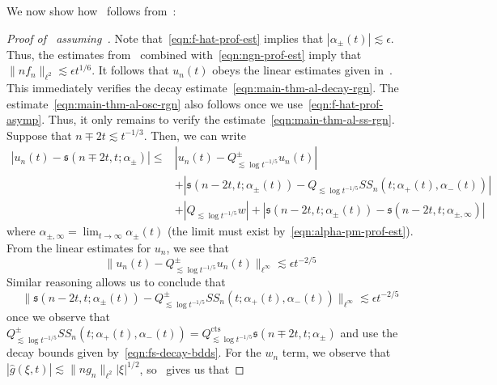 \documentclass[letterpaper, reqno,final]{amsart}
\newcommand{\fs}{\mathfrak{s}}
\newcommand{\mSS}{\mathit{SS}}
\newcommand{\tcts}{\text{cts}}
\begin{document}
We now show how~ follows from~:
\begin{proof}[Proof of~ assuming~]
    Note that~\eqref{eqn:f-hat-prof-est} implies that $|\alpha_\pm(t)| \lesssim \epsilon$.  Thus, the estimates from~ combined with~\eqref{eqn:ngn-prof-est} imply that $\lVert n f_n \rVert_{\ell^2} \lesssim \epsilon t^{1/6}$.  It follows that $u_n(t)$ obeys the linear estimates given in~.  This immediately verifies the decay estimate~\eqref{eqn:main-thm-al-decay-rgn}.  The estimate~\eqref{eqn:main-thm-al-osc-rgn} also follows once we use~\eqref{eqn:f-hat-prof-asymp}.  Thus, it only remains to verify the estimate~\eqref{eqn:main-thm-al-ss-rgn}.  Suppose that $n \mp 2t \lesssim t^{-1/3}$.  Then, we can write
    \begin{equation*}\begin{split}
        |u_n(t) - \fs(n \mp 2t, t; \alpha_{\pm})| \leq& |u_n(t) - Q_{\lesssim \log t^{-1/5}}^\pm u_n(t)|\\ 
        &+ |\fs(n - 2t, t; \alpha_\pm(t)) - Q_{\lesssim \log t^{-1/5}} \mSS_n(t;\alpha_{+}(t),\alpha_{-}(t))|\\ 
        &+ |Q_{\lesssim \log t^{-1/5}} w| + |\fs(n - 2t, t; \alpha_{\pm}(t)) - \fs(n - 2t, t; \alpha_{\pm,\infty})|
    \end{split}\end{equation*}
    where $\alpha_{\pm,\infty} = \lim_{t \to \infty} \alpha_\pm(t)$ (the limit must exist by~\eqref{eqn:alpha-pm-prof-est}).   From the linear estimates for $u_n$, we see that
    \begin{equation*}
        \lVert u_n(t) - Q_{\lesssim \log t^{-1/5}}^\pm u_n(t)\rVert_{\ell^\infty} \lesssim \epsilon t^{-2/5}
    \end{equation*}
    Similar reasoning allows us to conclude that 
    \begin{equation*}
        \lVert \fs(n - 2t, t; \alpha_{\pm}(t)) - Q_{\lesssim \log t^{-1/5}}^\pm \mSS_n(t;\alpha_+(t),\alpha_-(t))\rVert_{\ell^\infty} \lesssim \epsilon t^{-2/5}
    \end{equation*}
    once we observe that $Q_{\lesssim \log t^{-1/5}}^\pm \mSS_n(t;\alpha_+(t),\alpha_-(t)) = Q_{\lesssim \log t^{-1/5}}^\tcts \fs(n \mp 2t,t; \alpha_\pm)$ and use the decay bounds given by~\eqref{eqn:fs-decay-bdds}.  For the $w_n$ term, we observe that $|\hat{g}(\xi,t)| \lesssim \lVert ng_n \rVert_{\ell^2} |\xi|^{1/2}$, so~ gives us that

\end{proof}
\end{document}
